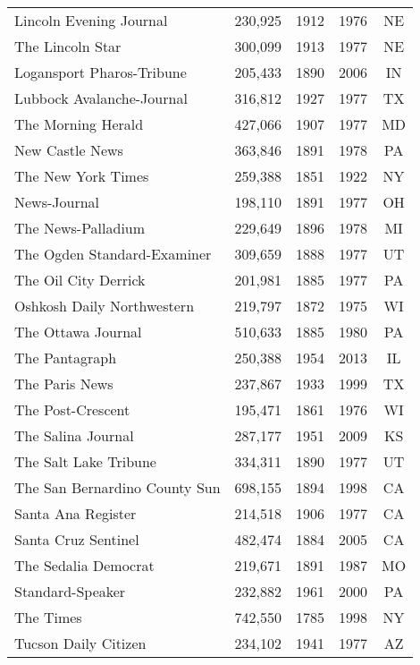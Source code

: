 \documentclass[11pt]{article}
\begin{document}
\begin{table}[t]
\begin{tabular}{lcccc}
Lincoln Evening Journal &  230,925 & 1912 & 1976 & NE\\
The Lincoln Star &  300,099 & 1913 & 1977 & NE\\
Logansport Pharos-Tribune &  205,433 & 1890 & 2006 & IN\\
Lubbock Avalanche-Journal &  316,812 & 1927 & 1977 & TX\\
The Morning Herald &  427,066 & 1907 & 1977 & MD\\
New Castle News &  363,846 & 1891 & 1978 & PA\\
The New York Times &  259,388 & 1851 & 1922 & NY\\
News-Journal &  198,110 & 1891 & 1977 & OH\\
The News-Palladium &  229,649 & 1896 & 1978 & MI\\
The Ogden Standard-Examiner &  309,659 & 1888 & 1977 & UT\\
The Oil City Derrick &  201,981 & 1885 & 1977 & PA\\
Oshkosh Daily Northwestern &  219,797 & 1872 & 1975 & WI\\
The Ottawa Journal &  510,633 & 1885 & 1980 & PA\\
The Pantagraph &  250,388 & 1954 & 2013 & IL\\
The Paris News &  237,867 & 1933 & 1999 & TX\\
The Post-Crescent &  195,471 & 1861 & 1976 & WI\\
The Salina Journal &  287,177 & 1951 & 2009 & KS\\
The Salt Lake Tribune &  334,311 & 1890 & 1977 & UT\\
The San Bernardino County Sun &  698,155 & 1894 & 1998 & CA\\
Santa Ana Register &  214,518 & 1906 & 1977 & CA\\
Santa Cruz Sentinel &  482,474 & 1884 & 2005 & CA\\
The Sedalia Democrat &  219,671 & 1891 & 1987 & MO\\
Standard-Speaker &  232,882 & 1961 & 2000 & PA\\
The Times &  742,550 & 1785 & 1998 & NY\\
Tucson Daily Citizen &  234,102 & 1941 & 1977 & AZ\\
\bottomrule \bottomrule
\end{tabular}
\end{table}
\end{document}
